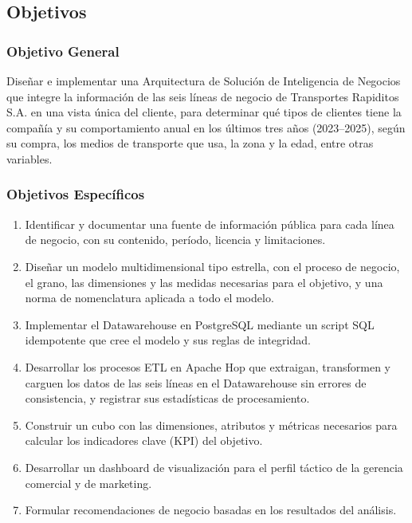 \subsection{Objetivos}

\subsubsection{Objetivo General}

Diseñar e implementar una Arquitectura de Solución de Inteligencia de Negocios
que integre la información de las seis líneas de negocio de Transportes
Rapiditos S.A. en una vista única del cliente, para determinar qué tipos de
clientes tiene la compañía y su comportamiento anual en los últimos tres años
(2023--2025), según su compra, los medios de transporte que usa, la zona y la
edad, entre otras variables.

\subsubsection{Objetivos Específicos}

\begin{enumerate}[leftmargin=*, label=\arabic*.]
  \item Identificar y documentar una fuente de información pública para cada
        línea de negocio, con su contenido, período, licencia y limitaciones.
  \item Diseñar un modelo multidimensional tipo estrella, con el proceso de
        negocio, el grano, las dimensiones y las medidas necesarias para el
        objetivo, y una norma de nomenclatura aplicada a todo el modelo.
  \item Implementar el Datawarehouse en PostgreSQL mediante un script SQL
        idempotente que cree el modelo y sus reglas de integridad.
  \item Desarrollar los procesos ETL en Apache Hop que extraigan, transformen
        y carguen los datos de las seis líneas en el Datawarehouse sin errores
        de consistencia, y registrar sus estadísticas de procesamiento.
  \item Construir un cubo con las dimensiones, atributos y métricas
        necesarios para calcular los indicadores clave (KPI) del objetivo.
  \item Desarrollar un dashboard de visualización para el perfil táctico de
        la gerencia comercial y de marketing.
  \item Formular recomendaciones de negocio basadas en los resultados del
        análisis.
\end{enumerate}

